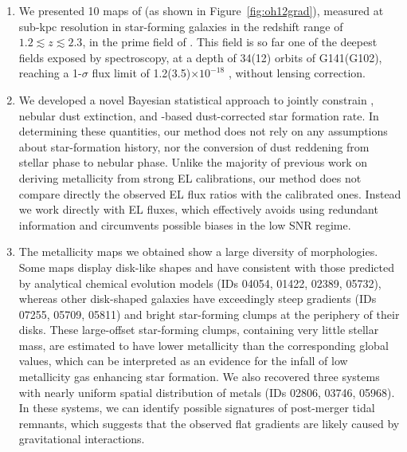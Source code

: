 \begin{enumerate}

    \item We presented 10 maps of \gpm (as shown in Figure~\ref{fig:oh12grad}), measured at sub-kpc resolution in star-forming
    galaxies in the redshift range of $1.2\lesssim z\lesssim2.3$, in the prime field of \clyi.  This field is so far one of the
    deepest fields exposed by \hst spectroscopy, at a depth of 34(12) orbits of G141(G102),
    reaching a 1-$\sigma$ flux limit of 1.2(3.5)$\times$$10^{-18}$ \Funit, without lensing correction.

    \item We developed a novel Bayesian statistical approach to
    jointly constrain \gpm, nebular dust extinction, and \Ha-based
    dust-corrected star formation rate. In determining these
    quantities, our method does not rely on any assumptions about
    star-formation history, nor the conversion of dust reddening from
    stellar phase to nebular phase.  Unlike the majority of
    previous work on deriving metallicity from strong EL calibrations,
    our method does not compare directly the observed EL flux ratios
    with the calibrated ones. Instead we work directly with EL fluxes, which
    effectively avoids using redundant information and circumvents
    possible biases in the low SNR regime.

    \item The metallicity maps we obtained show a large diversity
    of morphologies. Some maps display disk-like shapes and have \mgs
    consistent with those predicted by analytical chemical evolution
    models (\ie IDs 04054, 01422, 02389, 05732), whereas other
    disk-shaped galaxies have exceedingly steep gradients (\ie IDs
    07255, 05709, 05811) and bright star-forming clumps at the
    periphery of their disks. These large-offset star-forming clumps, containing very little stellar mass, are estimated to have
    lower metallicity than the corresponding global values, which can be interpreted as an evidence for the infall of low
    metallicity gas enhancing star formation.
    We also recovered three systems with nearly uniform spatial distribution of metals (\ie IDs 02806, 03746, 05968). In these
    systems, we can identify possible signatures of post-merger tidal remnants, which suggests that the observed flat gradients
    are likely caused by gravitational interactions.


\end{enumerate}
